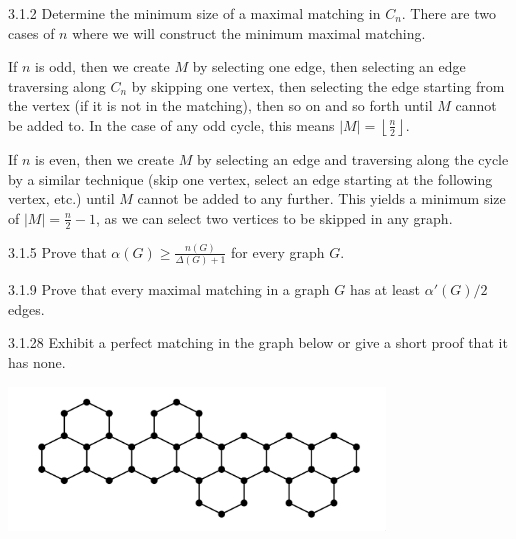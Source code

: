 \documentclass[10pt]{extarticle}
\begin{document}
  \begin{problem}{3.1.2}
    Determine the minimum size of a maximal matching in $C_n$.
    \tcblower
    There are two cases of $n$ where we will construct the minimum maximal matching.
    \begin{description}[font=\normalfont\scshape]
      \item[$n$ is odd:] If $n$ is odd, then we create $M$ by selecting one edge, then selecting an edge traversing along $C_n$ by skipping one vertex, then selecting the edge starting from the vertex (if it is not in the matching), then so on and so forth until $M$ cannot be added to. In the case of any odd cycle, this means $|M| = \left\lfloor \frac{n}{2}\right\rfloor$.
      \item[$n$ is even] If $n$ is even, then we create $M$ by selecting an edge and traversing along the cycle by a similar technique (skip one vertex, select an edge starting at the following vertex, etc.) until $M$ cannot be added to any further. This yields a minimum size of $|M| = \frac{n}{2} - 1$, as we can select two vertices to be skipped in any graph.
    \end{description}
  \end{problem}
  \begin{problem}{3.1.5}
    Prove that $\alpha(G) \geq \frac{n(G)}{\Delta(G)+1}$ for every graph $G$.
  \end{problem}
  \begin{problem}{3.1.9}
    Prove that every maximal matching in a graph $G$ has at least $\alpha'(G)/2$ edges.
  \end{problem}
  \begin{problem}{3.1.28}
    Exhibit a perfect matching in the graph below or give a short proof that it has none. 
    \begin{center}
      \includegraphics[width=10cm]{3_1_28_question}
    \end{center}
  \end{problem}
\end{document}
